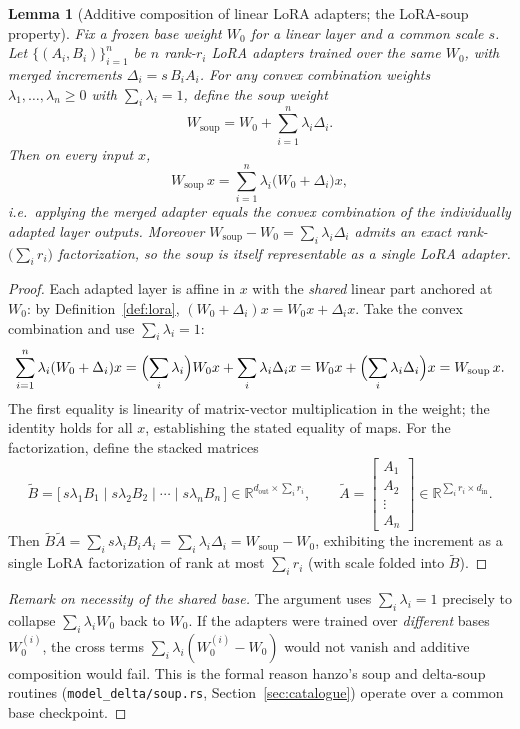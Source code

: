 \documentclass[11pt]{article}
\newtheorem{lemma}{Lemma}
\begin{document}
\begin{lemma}[Additive composition of linear LoRA adapters; the LoRA-soup property]
\label{lem:soup}
Fix a frozen base weight $W_0$ for a linear layer and a common scale $s$. Let $\{(A_i, B_i)\}_{i=1}^{n}$ be $n$ rank-$r_i$ LoRA adapters trained over the \emph{same} $W_0$, with merged increments $\Delta_i = s\, B_i A_i$. For any convex combination weights $\lambda_1, \dots, \lambda_n \ge 0$ with $\sum_i \lambda_i = 1$, define the soup weight
\[
W_{\text{soup}} = W_0 + \sum_{i=1}^{n} \lambda_i \Delta_i .
\]
Then on every input $x$,
\[
W_{\text{soup}}\, x = \sum_{i=1}^{n} \lambda_i \bigl(W_0 + \Delta_i\bigr) x ,
\]
i.e.\ applying the merged adapter equals the convex combination of the individually adapted layer outputs. Moreover $W_{\text{soup}} - W_0 = \sum_i \lambda_i \Delta_i$ admits an exact rank-$\bigl(\sum_i r_i\bigr)$ factorization, so the soup is itself representable as a single LoRA adapter.
\end{lemma}

\begin{proof}
Each adapted layer is affine in $x$ with the \emph{shared} linear part anchored at $W_0$: by Definition~\ref{def:lora}, $(W_0 + \Delta_i)x = W_0 x + \Delta_i x$. Take the convex combination and use $\sum_i \lambda_i = 1$:
\[
\sum_{i=1}^{n} \lambda_i (W_0 + \Delta_i) x
= \Bigl(\sum_i \lambda_i\Bigr) W_0 x + \sum_i \lambda_i \Delta_i x
= W_0 x + \Bigl(\sum_i \lambda_i \Delta_i\Bigr) x
= W_{\text{soup}}\, x .
\]
The first equality is linearity of matrix-vector multiplication in the weight; the identity holds for all $x$, establishing the stated equality of maps. For the factorization, define the stacked matrices
\[
\widetilde{B} = \bigl[\, s\lambda_1 B_1 \;\big|\; s\lambda_2 B_2 \;\big|\; \cdots \;\big|\; s\lambda_n B_n \,\bigr] \in \mathbb{R}^{d_{\text{out}} \times \sum_i r_i},
\qquad
\widetilde{A} = \begin{bmatrix} A_1 \\ A_2 \\ \vdots \\ A_n \end{bmatrix} \in \mathbb{R}^{\sum_i r_i \times d_{\text{in}}} .
\]
Then $\widetilde{B}\widetilde{A} = \sum_i s\lambda_i B_i A_i = \sum_i \lambda_i \Delta_i = W_{\text{soup}} - W_0$, exhibiting the increment as a single LoRA factorization of rank at most $\sum_i r_i$ (with scale folded into $\widetilde{B}$).
\end{proof}

\begin{proof}[Remark on necessity of the shared base]
The argument uses $\sum_i \lambda_i = 1$ precisely to collapse $\sum_i \lambda_i W_0$ back to $W_0$. If the adapters were trained over \emph{different} bases $W_0^{(i)}$, the cross terms $\sum_i \lambda_i (W_0^{(i)} - W_0)$ would not vanish and additive composition would fail. This is the formal reason hanzo's soup and delta-soup routines (\texttt{model\_delta/soup.rs}, Section~\ref{sec:catalogue}) operate over a common base checkpoint.
\end{proof}
\end{document}
